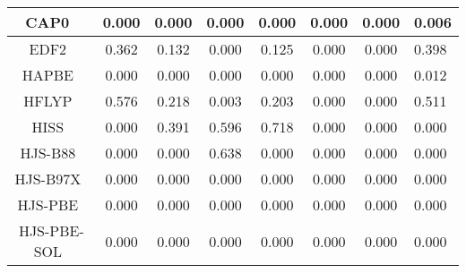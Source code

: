 \begin{tabular}{|c|c|c|c|c|c|c|l|}
                                      CAP0~\cite{Carmona2016_120} &                0.000 &                          0.000 &             0.000 &                        0.000 &                0.000 &                0.000 &                       0.006 \\ \hline
                                          EDF2~\cite{Lin2004_365} &                0.362 &                          0.132 &             0.000 &                        0.125 &                0.000 &                0.000 &                       0.398 \\ \hline
                                     HAPBE~\cite{Fabiano2015_122} &                0.000 &                          0.000 &             0.000 &                        0.000 &                0.000 &                0.000 &                       0.012 \\ \hline
                        HFLYP~\cite{Lee1988_785,Miehlich1989_200} &                0.576 &                          0.218 &             0.003 &                        0.203 &                0.000 &                0.000 &                       0.511 \\ \hline
                                 HISS~\cite{Henderson2007_221103} &                0.000 &                          0.391 &             0.596 &                        0.718 &                0.000 &                0.000 &                       0.000 \\ \hline
                              HJS-B88~\cite{Henderson2008_194105} &                0.000 &                          0.000 &             0.638 &                        0.000 &                0.000 &                0.000 &                       0.000 \\ \hline
                             HJS-B97X~\cite{Henderson2008_194105} &                0.000 &                          0.000 &             0.000 &                        0.000 &                0.000 &                0.000 &                       0.000 \\ \hline
                              HJS-PBE~\cite{Henderson2008_194105} &                0.000 &                          0.000 &             0.000 &                        0.000 &                0.000 &                0.000 &                       0.000 \\ \hline
                          HJS-PBE-SOL~\cite{Henderson2008_194105} &                0.000 &                          0.000 &             0.000 &                        0.000 &                0.000 &                0.000 &                       0.000 \\ \hline

\end{tabular}
